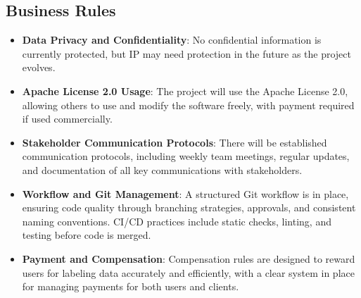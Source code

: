 \documentclass[12pt]{article}
\begin{document}
\subsection{Business Rules}
\begin{itemize}
    \item \textbf{Data Privacy and Confidentiality}: No confidential information is currently protected, but IP may need protection in the future as the project evolves.
    \item \textbf{Apache License 2.0 Usage}: The project will use the Apache License 2.0, allowing others to use and modify the software freely, with payment required if used commercially.
    \item \textbf{Stakeholder Communication Protocols}: There will be established communication protocols, including weekly team meetings, regular updates, and documentation of all key communications with stakeholders.
    \item \textbf{Workflow and Git Management}: A structured Git workflow is in place, ensuring code quality through branching strategies, approvals, and consistent naming conventions. CI/CD practices include static checks, linting, and testing before code is merged.
    \item \textbf{Payment and Compensation}: Compensation rules are designed to reward users for labeling data accurately and efficiently, with a clear system in place for managing payments for both users and clients.
\end{itemize}
\end{document}

